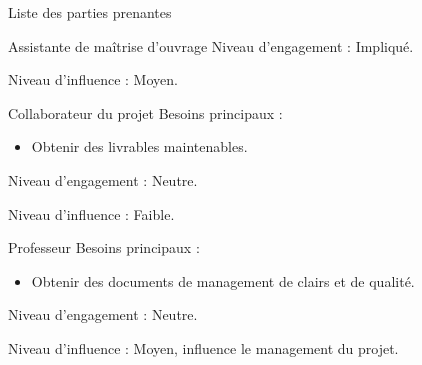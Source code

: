 \documentclass[]{article}
\begin{document}
\begin{section}{Liste des parties prenantes}
\begin{subsection}{Assistante de maîtrise d'ouvrage}
        Niveau d'engagement : Impliqué.

        Niveau d'influence : Moyen.

    \end{subsection}

    \begin{subsection}{Collaborateur du projet}
        Besoins principaux : 
        \begin{itemize}
            \item Obtenir des livrables maintenables.
        \end{itemize}

        Niveau d'engagement : Neutre.

        Niveau d'influence : Faible.

    \end{subsection}

    \begin{subsection}{Professeur}
        Besoins principaux : 
        \begin{itemize}
            \item Obtenir des documents de management de clairs et de qualité.
        \end{itemize}

        Niveau d'engagement : Neutre.

        Niveau d'influence : Moyen, influence le management du projet.

    \end{subsection}






\end{section}
\end{document}
